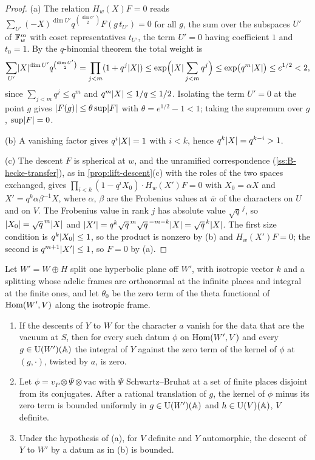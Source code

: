 \begin{proof}
(a) The relation $H_w(X)F=0$ reads $\sum_{U'}(-X)^{\dim U'}q^{\binom{\dim U'}2}F(g\,t_{U'})=0$ for all $g$, the sum over the subspaces $U'$ of $\mathbb{F}_w^m$ with coset representatives $t_{U'}$, the term $U'=0$ having coefficient $1$ and
$t_0=1$. By the $q$-binomial theorem the total weight is
\[
  \sum_{U'}\lvert X\rvert^{\dim U'}q^{\binom{\dim U'}2}=\prod_{j<m}(1+q^j\lvert X\rvert)\le\exp\Bigl(\lvert X\rvert\sum_{j<m}q^j\Bigr)\le\exp\bigl(q^m\lvert X\rvert\bigr)\le e^{1/2}<2,
\]
since $\sum_{j<m}q^j\le q^m$ and $q^m\lvert X\rvert\le1/q\le1/2$. Isolating the term $U'=0$ at the point $g$ gives $\lvert F(g)\rvert\le\theta\sup\lvert F\rvert$ with $\theta=e^{1/2}-1<1$; taking the supremum over $g$, $\sup\lvert F\rvert=0$.

(b) A vanishing factor gives $q^i\lvert X\rvert=1$ with $i<k$, hence $q^k\lvert X\rvert=q^{k-i}>1$.

(c) The descent $F$ is spherical at $w$, and the unramified correspondence (\cref{ss:B-hecke-transfer}), as in \cref{prop:lift-descent}(c) with the roles of the two spaces exchanged, gives
$\prod_{i<k}(1-q^iX_0)\cdot H_w(X')F=0$ with $X_0=\alpha X$ and $X'=q^k\alpha\beta^{-1}X$, where $\alpha$, $\beta$ are the Frobenius values at $\bar w$ of the characters on $U$ and on $V$. The Frobenius value in rank $j$ has absolute
value $\sqrt q^{\,j}$, so $\lvert X_0\rvert=\sqrt q^{\,m}\lvert X\rvert$ and $\lvert X'\rvert=q^k\sqrt q^{\,m}\sqrt q^{\,-m-k}\lvert X\rvert=\sqrt q^{\,k}\lvert X\rvert$. The first size condition is $q^k\lvert X_0\rvert\le1$, so the product is nonzero by (b) and $H_w(X')F=0$; the second is
$q^{m+1}\lvert X'\rvert\le1$, so $F=0$ by (a).
\end{proof}

\begin{lemma}\label{lem:zero-term}
Let $W'=W\oplus H$ split one hyperbolic plane off $W'$, with isotropic vector $k$ and a splitting whose adelic frames are orthonormal at the infinite places and integral at the finite ones, and let $\theta_0$
be the zero term of the theta functional of $\operatorname{Hom}(W',V)$ along the isotropic frame.
\begin{enumerate}[label=\textup{(\alph*)}]
\item If the descents of $Y$ to $W$ for the character $a$ vanish for the data that are the vacuum at $S$, then for every such datum $\phi$ on $\operatorname{Hom}(W',V)$ and every $g\in\operatorname{U}(W')(\mathbb{A})$ the integral of $Y$ against the zero term
of the kernel of $\phi$ at $(g,\cdot)$, twisted by $a$, is zero.
\item Let $\phi=v_P\otimes\Psi\otimes\mathrm{vac}$ with $\Psi$ Schwartz--Bruhat at a set of finite places disjoint from its conjugates. After a rational translation of $g$, the kernel of $\phi$ minus its zero term is bounded
uniformly in $g\in\operatorname{U}(W')(\mathbb{A})$ and $h\in\operatorname{U}(V)(\mathbb{A})$, $V$ definite.
\item Under the hypothesis of (a), for $V$ definite and $Y$ automorphic, the descent of $Y$ to $W'$ by a datum as in (b) is bounded.
\end{enumerate}
\end{lemma}

